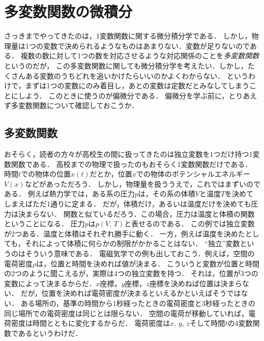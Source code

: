 \chapter{多変数関数の微積分}
さっきまでやってきたのは，1変数関数に関する微分積分学である．
しかし，物理量は1つの変数で決められるようなものはあまりない．変数が足りないのである．
複数の数に対して1つの数を対応させるような対応関係のことを\emph{多変数関数}
というのだが，
この多変数関数に関しても微分積分学を考えたい．しかし，たくさんある変数のうちどれを追いかけたらいいのかよくわからない．
というわけで，まずは1つの変数にのみ着目し，あとの変数は定数だとみなしてしまうことにしよう．
このときに使うのが偏微分である．
偏微分を学ぶ前に，とりあえず多変数関数について確認しておこうか．
\section{多変数関数}
おそらく，読者の方々が高校生の間に扱ってきたのは独立変数を1つだけ持つ1変数関数である．
高校までの物理で扱ったのもおそらく1変数関数だけである．
時間$t$での物体の位置$x(t)$だとか，位置$x$での物体のポテンシャルエネルギー$V(x)$などがあっただろう．
しかし，物理量を扱ううえで，これではまずいのである．
例えば熱力学では，ある系の圧力$p$は，その系の体積$V$と温度$T$を決めてしまえばただ1通りに定まる．
だが，体積だけ，あるいは温度だけを決めても圧力は決まらない．
関数と似ているだろう．この場合，圧力は温度と体積の関数ということになる．
圧力$p$は$p(V, \, T)$と表せるのである．
この例では独立変数が2つある．温度と体積はそれぞれ勝手に動く．
一方，例えば温度を決めたとしても，それによって体積に何らかの制限がかかることはない．
``独立''変数というのはそういう意味である．
電磁気学での例も出しておこう．例えば，空間の電荷密度$\rho$は，位置と時間を決めれば値が決まる．
こういうと変数が位置と時間の2つのように聞こえるが，実際は4つの独立変数を持つ．
それは，位置が3つの変数によって決まるからだ．$x$座標，$y$座標，$z$座標を決めねば位置は決まらない．
だが，位置を決めれば電荷密度が決まるといえるかといえばそうではない．
ある場所の，基準の時間から1秒経ったときの電荷密度と3秒経ったときの同じ場所での電荷密度は同じとは限らない．
空間の電荷が移動していれば，電荷密度は時間とともに変化するからだ．
電荷密度は$x, \, y, \, z$そして時間$t$の4変数関数であるというわけだ．

